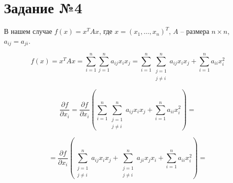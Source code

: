 \documentclass[a4paper,14pt]{extarticle}
\theoremstyle{definition}
\begin{document}
\section{Задание №4}




В нашем случае $f(x)=x^T A x$, где $x=(x_1,\ldots, x_n)^T$, $A$ -- размера $n \times n$, 
$a_{ij}=a_{ji}$.

$$
f(x)=x^T A x = \sum_{i=1}^n \sum_{j=1}^{n} a_{ij} x_i x_j = 
\sum_{i=1}^n \sum_{\begin{smallmatrix}j=1 \\ j \neq i\end{smallmatrix}}^{n} a_{ij} x_i x_j +
\sum_{i=1}^n a_{ii}x_i^2
$$

$$
\frac{\partial f}{\partial x_i} = \frac{\partial f}{\partial x_i} \left(\sum_{i=1}^n \sum_{\begin{smallmatrix}j=1 \\ j \neq i\end{smallmatrix}}^{n} a_{ij} x_i x_j +
\sum_{i=1}^n a_{ii}x_i^2 \right) =
$$

$$
= \frac{\partial f}{\partial x_i} \left(
    \sum_{\begin{smallmatrix}j=1 \\ j \neq i\end{smallmatrix}}^{n} a_{ij} x_i x_j 
    + \sum_{\begin{smallmatrix}j=1 \\ j \neq i\end{smallmatrix}}^{n} a_{ji} x_j x_i +
    \sum_{i=1}^n a_{ii}x_i^2 
  \right) =
$$
\end{document}
